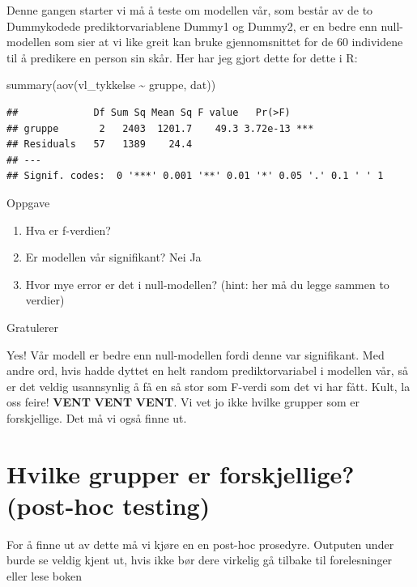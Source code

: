 \documentclass[
]{book}
\newenvironment{Shaded}{\begin{snugshade}}{\end{snugshade}}
\newcommand{\FunctionTok}[1]{\textcolor[rgb]{0.00,0.00,0.00}{#1}}
\newcommand{\NormalTok}[1]{#1}
\newcommand{\SpecialCharTok}[1]{\textcolor[rgb]{0.00,0.00,0.00}{#1}}
\providecommand{\tightlist}{%
  \setlength{\itemsep}{0pt}\setlength{\parskip}{0pt}}
\begin{document}
Denne gangen starter vi må å teste om modellen vår, som består av de to Dummykodede prediktorvariablene Dummy1 og Dummy2, er en bedre enn null-modellen som sier at vi like greit kan bruke gjennomsnittet for de 60 individene til å predikere en person sin skår. Her har jeg gjort dette for dette i R:

\begin{Shaded}
\begin{Highlighting}[]
\FunctionTok{summary}\NormalTok{(}\FunctionTok{aov}\NormalTok{(vl\_tykkelse }\SpecialCharTok{\textasciitilde{}}\NormalTok{ gruppe, dat))}
\end{Highlighting}
\end{Shaded}

\begin{verbatim}
##             Df Sum Sq Mean Sq F value   Pr(>F)    
## gruppe       2   2403  1201.7    49.3 3.72e-13 ***
## Residuals   57   1389    24.4                     
## ---
## Signif. codes:  0 '***' 0.001 '**' 0.01 '*' 0.05 '.' 0.1 ' ' 1
\end{verbatim}

{Oppgave}

\begin{enumerate}
\def\labelenumi{\alph{enumi})}
\tightlist
\item
  Hva er f-verdien?
\item
  Er modellen vår signifikant? Nei Ja
\item
  Hvor mye error er det i null-modellen? (hint: her må du legge sammen to verdier)
\end{enumerate}

{Gratulerer}

Yes! Vår modell er bedre enn null-modellen fordi denne var signifikant. Med andre ord, hvis hadde dyttet en helt random prediktorvariabel i modellen vår, så er det veldig usannsynlig å få en så stor som F-verdi som det vi har fått. Kult, la oss feire! \textbf{VENT} \textbf{VENT} \textbf{VENT}. Vi vet jo ikke hvilke grupper som er forskjellige. Det må vi også finne ut.

\hypertarget{hvilke-grupper-er-forskjellige-post-hoc-testing}{%
\section{Hvilke grupper er forskjellige? (post-hoc testing)}\label{hvilke-grupper-er-forskjellige-post-hoc-testing}}

For å finne ut av dette må vi kjøre en en post-hoc prosedyre. Outputen under burde se veldig kjent ut, hvis ikke bør dere virkelig gå tilbake til forelesninger eller lese boken
\end{document}
